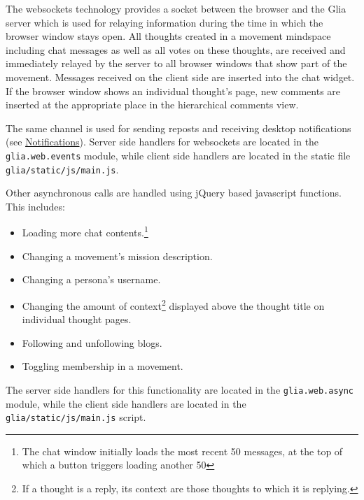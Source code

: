 The websockets technology provides a socket between the browser and the
Glia server which is used for relaying information during the time in
which the browser window stays open. All thoughts created in a movement
mindspace including chat messages as well as all votes on these
thoughts, are received and immediately relayed by the server to all
browser windows that show part of the movement. Messages received on the
client side are inserted into the chat widget. If the browser window
shows an individual thought's page, new comments are inserted at the
appropriate place in the hierarchical comments view.

The same channel is used for sending reposts and receiving desktop
notifications (see \hyperref[notifications-1]{Notifications}). Server
side handlers for websockets are located in the \texttt{glia.web.events}
module, while client side handlers are located in the static file
\texttt{glia/static/js/main.js}.

Other asynchronous calls are handled using jQuery based javascript
functions. This includes:

\begin{itemize}
\tightlist
\item
  Loading more chat contents.\footnote{The chat window initially loads
    the most recent 50 messages, at the top of which a button triggers
    loading another 50}
\item
  Changing a movement's mission description.
\item
  Changing a persona's username.
\item
  Changing the amount of context\footnote{If a thought is a reply, its
    context are those thoughts to which it is replying.} displayed above
  the thought title on individual thought pages.
\item
  Following and unfollowing blogs.
\item
  Toggling membership in a movement.
\end{itemize}

The server side handlers for this functionality are located in the
\texttt{glia.web.async} module, while the client side handlers are
located in the \texttt{glia/static/js/main.js} script.


